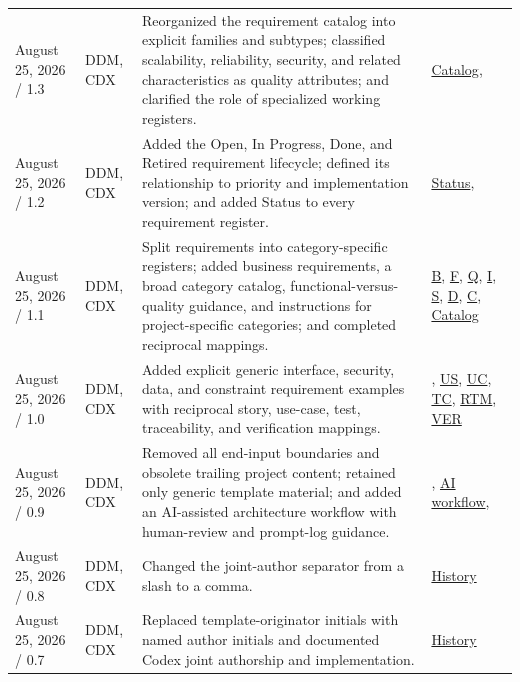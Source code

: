\begin{tabularx}{\linewidth}{L{3.1cm}L{2.2cm}YL{2.0cm}}
August 25, 2026 / 1.3 & DDM, CDX & Reorganized the requirement catalog into explicit families and subtypes; classified scalability, reliability, security, and related characteristics as quality attributes; and clarified the role of specialized working registers. & \hyperref[Table:RequirementCategoryCatalog]{Catalog}, \\
August 25, 2026 / 1.2 & DDM, CDX & Added the Open, In Progress, Done, and Retired requirement lifecycle; defined its relationship to priority and implementation version; and added Status to every requirement register. & \hyperref[Table:RequirementStatusDefinitions]{Status}, \\
August 25, 2026 / 1.1 & DDM, CDX & Split requirements into category-specific registers; added business requirements, a broad category catalog, functional-versus-quality guidance, and instructions for project-specific categories; and completed reciprocal mappings. & \hyperref[Table:BusinessRequirements]{B}, \hyperref[Table:FunctionalRequirements]{F}, \hyperref[Table:QualityRequirements]{Q}, \hyperref[Table:InterfaceRequirements]{I}, \hyperref[Table:SecurityRequirements]{S}, \hyperref[Table:DataRequirements]{D}, \hyperref[Table:ConstraintRequirements]{C}, \hyperref[Table:RequirementCategoryCatalog]{Catalog}\\
August 25, 2026 / 1.0 & DDM, CDX & Added explicit generic interface, security, data, and constraint requirement examples with reciprocal story, use-case, test, traceability, and verification mappings. & , \hyperref[Table:UserStories]{US}, \hyperref[Chapter:UseCases]{UC}, \hyperref[Chapter:Tests]{TC}, \hyperref[Table:TraceabilityMatrix]{RTM}, \hyperref[Table:VerificationRegister]{VER}\\
August 25, 2026 / 0.9 & DDM, CDX & Removed all end-input boundaries and obsolete trailing project content; retained only generic template material; and added an AI-assisted architecture workflow with human-review and prompt-log guidance. & , \hyperref[Section:AIArchitectureWorkflow]{AI workflow}, \\
August 25, 2026 / 0.8 & DDM, CDX & Changed the joint-author separator from a slash to a comma. & \hyperref[Table:DocumentHistory]{History}\\
August 25, 2026 / 0.7 & DDM, CDX & Replaced template-originator initials with named author initials and documented Codex joint authorship and implementation. & \hyperref[Table:DocumentHistory]{History}\\

\end{tabularx}
